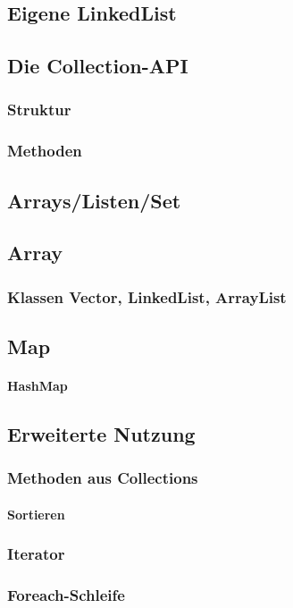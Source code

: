 \label{sec:java_datenstrukturen}


\subsection{Eigene LinkedList}

\subsection{Die Collection-API}
	
	\subsubsection{Struktur}
	
	\subsubsection{Methoden}

\subsection{Arrays/Listen/Set}
	
	\subsection{Array}
	
	\subsubsection{Klassen Vector, LinkedList, ArrayList}

\subsection{Map}
	
	\paragraph{HashMap}

\subsection{Erweiterte Nutzung}
	
	\subsubsection{Methoden aus Collections}
		
		\paragraph{Sortieren}
	
	\subsubsection{Iterator}
	
	\subsubsection{Foreach-Schleife}
